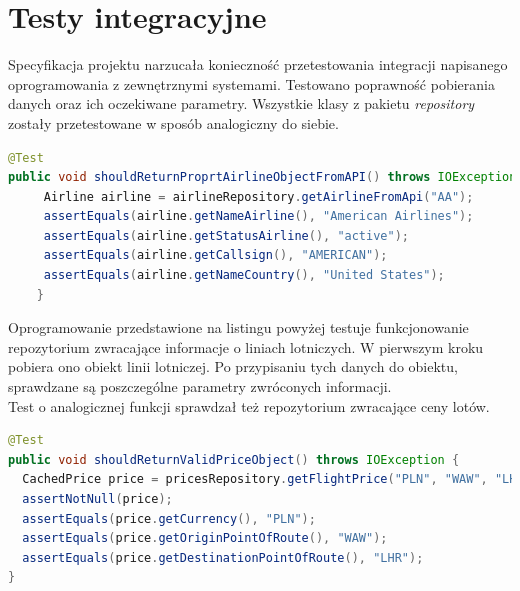 \documentclass[12pt, twoside]{report}
\begin{document}
\section{Testy integracyjne}
Specyfikacja projektu narzucała konieczność przetestowania integracji napisanego oprogramowania z zewnętrznymi systemami. Testowano poprawność pobierania danych oraz ich oczekiwane parametry. Wszystkie klasy z pakietu \textit{repository} zostały przetestowane w sposób analogiczny do siebie.
\begin{lstlisting}[language=java, caption=Przykładowy test integracyjny]
@Test
public void shouldReturnProprtAirlineObjectFromAPI() throws IOException {
     Airline airline = airlineRepository.getAirlineFromApi("AA");
     assertEquals(airline.getNameAirline(), "American Airlines");
     assertEquals(airline.getStatusAirline(), "active");
     assertEquals(airline.getCallsign(), "AMERICAN");
     assertEquals(airline.getNameCountry(), "United States");
    }
\end{lstlisting}
Oprogramowanie przedstawione na listingu powyżej testuje funkcjonowanie repozytorium zwracające informacje o liniach lotniczych. W pierwszym kroku pobiera ono obiekt linii lotniczej. Po przypisaniu tych danych do obiektu, sprawdzane są poszczególne parametry zwróconych informacji. \\ \indent
Test o analogicznej funkcji sprawdzał też repozytorium zwracające ceny lotów.
\begin{lstlisting}[language=java, caption=Przykładowy test integracyjny]
@Test
public void shouldReturnValidPriceObject() throws IOException {
  CachedPrice price = pricesRepository.getFlightPrice("PLN", "WAW", "LHR", "20190128", "20190130");
  assertNotNull(price);
  assertEquals(price.getCurrency(), "PLN");
  assertEquals(price.getOriginPointOfRoute(), "WAW");
  assertEquals(price.getDestinationPointOfRoute(), "LHR");
}
\end{lstlisting}

\newpage
\end{document}
